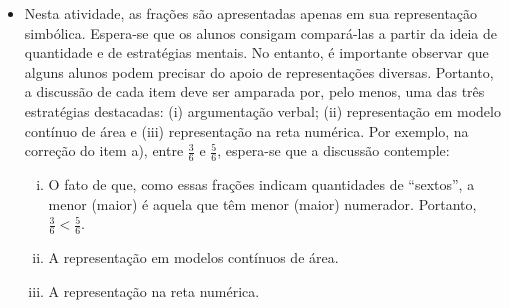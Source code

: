\begin{orientacoes}{}{}
   \begin{itemize}
  \item Nesta atividade, as frações são apresentadas apenas em sua representação simbólica. Espera-se que os alunos consigam compará-las a partir da ideia de quantidade e de estratégias mentais. No entanto, é importante observar que alguns alunos podem precisar do apoio de representações diversas. Portanto, a discussão de cada item deve ser amparada por, pelo menos, uma das três estratégias destacadas: (i) argumentação verbal; (ii) representação em modelo contínuo de área e (iii) representação na reta numérica. Por exemplo, na correção do item a), entre $\frac{3}{6}$ e $\frac{5}{6}$, espera-se que a discussão contemple:

   \begin{enumerate}[(i)]
    \item O fato de que, como essas frações indicam quantidades de ``sextos'', a menor (maior) é aquela que têm menor (maior) numerador. Portanto, $\frac{3}{6}< \frac{5}{6}$.
    \item A representação em modelos contínuos de área.
\begin{center}
\end{center}
    \item A representação na reta numérica. 
      \begin{center}
\end{center}
\end{enumerate}
\end{itemize}
\end{orientacoes}
